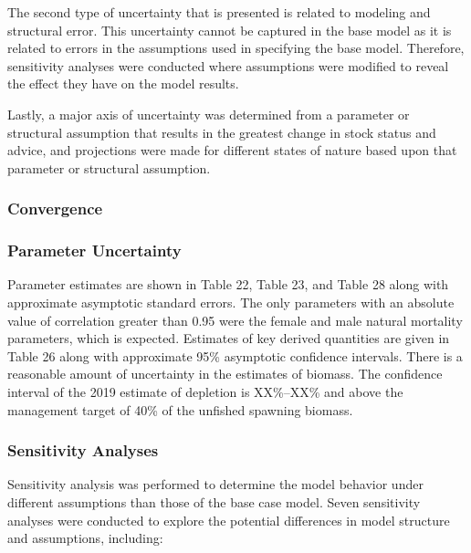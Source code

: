 \documentclass[
]{scrartcl}
\begin{document}
The second type of uncertainty that is presented is related to modeling
and structural error. This uncertainty cannot be captured in the base
model as it is related to errors in the assumptions used in specifying
the base model. Therefore, sensitivity analyses were conducted where
assumptions were modified to reveal the effect they have on the model
results.

Lastly, a major axis of uncertainty was determined from a parameter or
structural assumption that results in the greatest change in stock
status and advice, and projections were made for different states of
nature based upon that parameter or structural assumption.

\subsubsection{Convergence}\label{convergence}

\subsubsection{Parameter Uncertainty}\label{parameter-uncertainty}

Parameter estimates are shown in Table 22, Table 23, and Table 28 along
with approximate asymptotic standard errors. The only parameters with an
absolute value of correlation greater than 0.95 were the female and male
natural mortality parameters, which is expected. Estimates of key
derived quantities are given in Table 26 along with approximate 95\%
asymptotic confidence intervals. There is a reasonable amount of
uncertainty in the estimates of biomass. The confidence interval of the
2019 estimate of depletion is XX\%--XX\% and above the management target
of 40\% of the unfished spawning biomass.

\subsubsection{Sensitivity Analyses}\label{sensitivity-analyses}

Sensitivity analysis was performed to determine the model behavior under
different assumptions than those of the base case model. Seven
sensitivity analyses were conducted to explore the potential differences
in model structure and assumptions, including:
\end{document}

